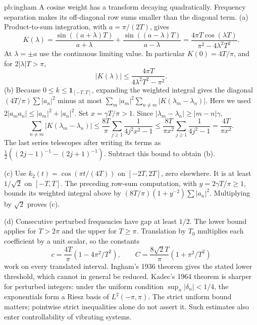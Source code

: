 \begin{solution}{pb:ingham}
\idea A cosine weight has a transform decaying quadratically. Frequency separation makes its off-diagonal row sums smaller than the diagonal term.
\writeup (a) Product-to-sum integration, with $a=\pi/(2T)$, gives
\[K(\lambda)=\frac{\sin((a+\lambda)T)}{a+\lambda}+\frac{\sin((a-\lambda)T)}{a-\lambda}
 =\frac{4\pi T\cos(\lambda T)}{\pi^2-4\lambda^2T^2}.
\]
At $\lambda=\pm a$ use the continuous limiting value. In particular $K(0)=4T/\pi$, and for $2|\lambda|T>\pi$,
\[|K(\lambda)|\le\frac{4\pi T}{4\lambda^2T^2-\pi^2}.
\]
(b) Because $0\le k\le\mathbf1_{[-T,T]}$, expanding the weighted integral gives the diagonal $(4T/\pi)\sum|a_n|^2$ minus at most $\sum_m|a_m|^2\sum_{n\ne m}|K(\lambda_m-\lambda_n)|$. Here we used $2|a_ma_n|\le|a_m|^2+|a_n|^2$. Set $x=\gamma T/\pi>1$. Since $|\lambda_m-\lambda_n|\ge|m-n|\gamma$,
\[\sum_{n\ne m}|K(\lambda_m-\lambda_n)|
 \le\frac{8T}{\pi}\sum_{j\ge1}\frac1{4j^2x^2-1}
 \le\frac{8T}{\pi x^2}\sum_{j\ge1}\frac1{4j^2-1}=\frac{4T}{\pi x^2}.
\]
The last series telescopes after writing its terms as $\tfrac12((2j-1)^{-1}-(2j+1)^{-1})$. Subtract this bound to obtain (b).

(c) Use $k_2(t)=\cos(\pi t/(4T))$ on $[-2T,2T]$, zero elsewhere. It is at least $1/\sqrt2$ on $[-T,T]$. The preceding row-sum computation, with $y=2\gamma T/\pi\ge1$, bounds its weighted integral above by $(8T/\pi)(1+y^{-2})\sum|a_n|^2$. Multiplying by $\sqrt2$ proves (c).

(d) Consecutive perturbed frequencies have gap at least $1/2$. The lower bound applies for $T>2\pi$ and the upper for $T\ge\pi$. Translation by $T_0$ multiplies each coefficient by a unit scalar, so the constants
\[c=\frac{4T}{\pi}(1-4\pi^2/T^2),\qquad C=\frac{8\sqrt2T}{\pi}(1+\pi^2/T^2)
\]
work on every translated interval.
\leads Ingham's 1936 theorem gives the stated lower threshold, which cannot in general be reduced. Kadec's 1964 theorem is sharper for perturbed integers: under the uniform condition $\sup_n|\delta_n|<1/4$, the exponentials form a Riesz basis of $L^2(-\pi,\pi)$. The strict uniform bound matters; pointwise strict inequalities alone do not assert it. Such estimates also enter controllability of vibrating systems.
\end{solution}

